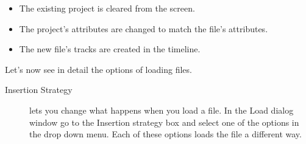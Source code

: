 \begin{itemize}[noitemsep]
    \item The existing project is cleared from the screen.
    \item The project's attributes are changed to match the file's attributes.
    \item The new file's tracks are created in the timeline.
\end{itemize}

\noindent Let's now see in detail the options of loading files.

\begin{description}
    \item[Insertion Strategy] 
    \CGG{} lets you change what happens when you load a file.  In the Load dialog window go to the Insertion strategy box and select one of the options in the drop down menu. Each of these options loads the file a different way.
    

\end{description}
